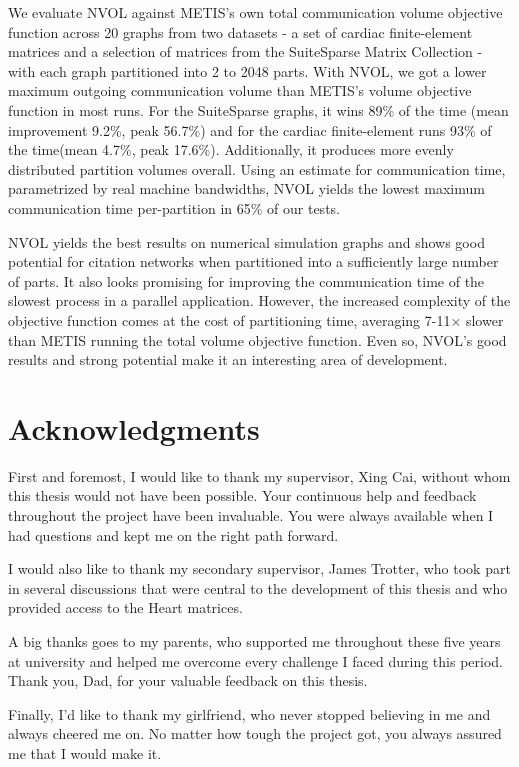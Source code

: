 \documentclass[UKenglish]{uiomasterthesis}
\begin{document}
	We evaluate NVOL against METIS's own total communication volume objective function across 20 graphs from two datasets - a set of cardiac finite-element matrices and a selection of matrices from the SuiteSparse Matrix Collection - with each graph partitioned into 2 to 2048 parts. With NVOL, we got a lower maximum outgoing communication volume than METIS's volume objective function in most runs. For the SuiteSparse graphs, it wins 89\% of the time (mean improvement 9.2\%, peak 56.7\%) and for the cardiac finite-element runs 93\% of the time(mean 4.7\%, peak 17.6\%). Additionally, it produces more evenly distributed partition volumes overall. Using an estimate for communication time, parametrized by real machine bandwidths, NVOL yields the lowest maximum communication time per-partition in 65\% of our tests.
		
 	NVOL yields the best results on numerical simulation graphs and shows good potential for citation networks when partitioned into a sufficiently large number of 	parts. It also looks promising for improving the communication time of the slowest process in a parallel application. However, the increased complexity of the objective function comes at the cost of partitioning time, averaging 7-11× slower than METIS running the total volume objective function. Even so, NVOL's good results and strong potential make it an interesting area of development.


	\chapter*{Acknowledgments}
	First and foremost, I would like to thank my supervisor, Xing Cai, without whom this thesis would not have been possible. Your continuous help and feedback throughout the project have been invaluable. You were always available when I had questions and kept me on the right path forward.
	
	I would also like to thank my secondary supervisor, James Trotter, who took part in several discussions that were central to the development of this thesis and who provided access to the Heart matrices.
	
	A big thanks goes to my parents, who supported me throughout these five years at university and helped me overcome every challenge I faced during this period. Thank you, Dad, for your valuable feedback on this thesis.
	
	Finally, I'd like to thank my girlfriend, who never stopped believing in me and always cheered me on. No matter how tough the project got, you always assured me that I would make it. 
		
\end{document}
